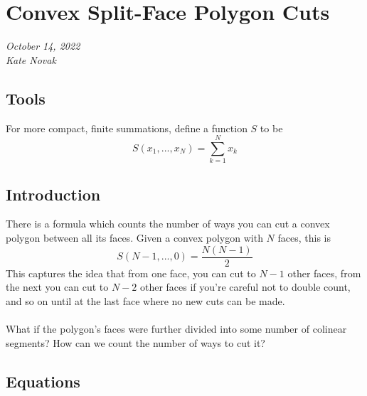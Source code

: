\documentclass[12pt]{article}
\begin{document}
\section*{Convex Split-Face Polygon Cuts}
{\em{October 14, 2022}}\\
{\em{Kate Novak}}

\subsection*{Tools}

For more compact, finite summations, define a function $S$ to be
\begin{equation}
    S(x_1,...,x_N) = \sum_{k=1}^{N} x_k
\end{equation}

\subsection*{Introduction}

There is a formula which counts the number of ways you can cut a convex polygon
between all its faces. Given a convex polygon with $N$ faces, this is
\begin{equation}
    S(N-1,...,0) = \frac{N (N - 1)}{2}
\end{equation}
This captures the idea that from one face, you can cut to $N-1$ other faces, from
the next you can cut to $N-2$ other faces if you're careful not to double count, and so on until at the last face where no new cuts can be made.
\\
\\
What if the polygon's faces were further divided into some number of colinear
segments? How can we count the number of ways to cut it?

\subsection*{Equations}
\end{document}
